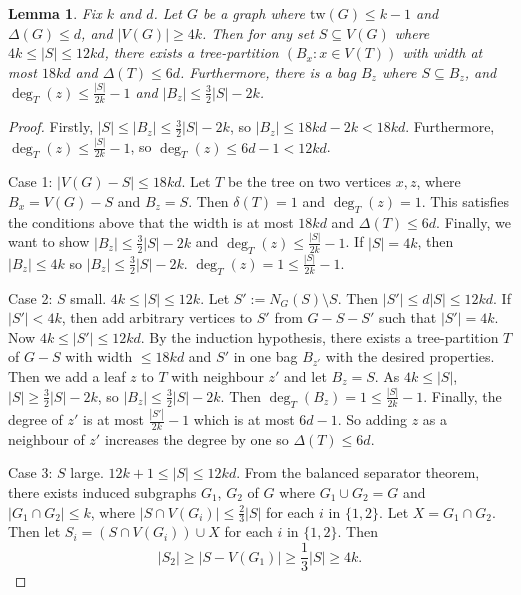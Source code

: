 \documentclass[]{article}
\newcommand{\tw}{\text{tw}}
\newtheorem{lemma}[theorem]{Lemma}
\theoremstyle{definition}
\numberwithin{theorem}{section}
\numberwithin{equation}{section}
\begin{document}
\begin{lemma}
	Fix $k$ and $d$. Let $G$ be a graph where $\tw(G) \leq k - 1$ and $\Delta(G) \leq d$, and $|V(G)|\geq 4k$. Then for any set $S \subseteq V(G)$ where $4k \leq |S| \leq 12kd$, there exists a tree-partition $\left( B_x : x \in V(T) \right)$ with width at most $18kd$ and $\Delta(T) \leq 6d$. Furthermore, there is a bag $B_z$ where $S \subseteq B_z$, and $\deg_{T}(z) \leq \frac{|S|}{2k} - 1$ and $|B_z| \leq \frac{3}{2} |S| - 2k$.
\end{lemma}
\begin{proof}

	Firstly, $|S| \leq |B_z| \leq \frac{3}{2} |S| - 2k$, so $|B_z| \leq 18kd - 2k < 18kd$. Furthermore, $\deg_T(z) \leq  \frac{|S|}{2k} - 1$, so $\deg_T(z) \leq 6d - 1 < 12kd$.  
	
	Case 1: $|V(G) - S| \leq 18kd$. Let $T$ be the tree on two vertices ${x, z}$, where $B_x = V(G) - S$ and $B_z = S$. Then $\delta(T) = 1$ and $\deg_T(z) = 1$. This satisfies the conditions above that the width is at most $18kd$ and $\Delta(T) \leq 6d$. Finally, we want to show $|B_z| \leq \frac{3}{2} |S| - 2k$ and $\deg_T(z) \leq \frac{|S|}{2k}- 1$. If $|S| = 4k$, then $|B_z| \leq 4k$ so $|B_z| \leq \frac{3}{2} |S| - 2k$. $\deg_T(z)  = 1 \leq \frac{|S|}{2k}- 1$.
	\par
	Case 2: $S$ small. $4k \leq |S| \leq 12k$. Let $S' := N_G(S) \setminus S$. Then $|S'| \leq d |S| \leq 12kd$. If $|S'| < 4k$, then add arbitrary vertices to $S'$ from $G - S - S'$ such that $|S'| = 4k$. Now $4k \leq |S'| \leq 12kd$. By the induction hypothesis, there exists a tree-partition $T$ of $G - S$ with width $\leq 18kd$ and $S'$ in one bag $B_{z'}$ with the desired properties. Then we add a leaf $z$ to $T$ with neighbour $z'$ and let $B_z = S$. As $4k \leq |S|$, $|S| \geq \frac{3}{2} |S| - 2k$, so $|B_z| \leq \frac{3}{2}  |S| - 2k$. Then $\deg_T(B_z) = 1 \leq \frac{|S|}{2k}- 1$. Finally, the degree of $z'$ is at most $\frac{|S'|}{2k} - 1$ which is at most $6d - 1$. So adding $z$ as a neighbour of $z'$ increases the degree by one so $\Delta(T) \leq 6d$. 
	\par
	Case 3: $S$ large. $12k + 1 \leq |S| \leq 12kd$. From the balanced separator theorem, there exists induced subgraphs $G_1$, $G_2$ of $G$ where $G_1 \cup G_2 = G$ and $|G_1 \cap G_2| \leq k$, where $|S \cap V (G_i)| \leq  \frac{2}{3}|S|$ for each $i$ in $\lbrace 1, 2 \rbrace$. Let $X = G_1 \cap G_2$. Then let $S_i = (S \cap V(G_i)) \cup X$ for each $i$ in $\lbrace 1, 2 \rbrace$. 
	Then \[|S_2| \geq |S - V(G_1)| \geq \frac{1}{3} |S| \geq 4k.\]

\end{proof}
\end{document}
